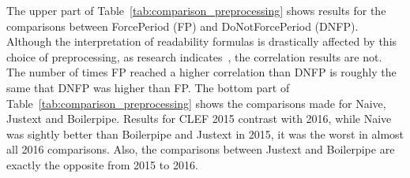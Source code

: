 The upper part of Table~\ref{tab:comparison_preprocessing} shows results for the comparisons between ForcePeriod (FP) and DoNotForcePeriod (DNFP). Although the interpretation of readability formulas is drastically affected by this choice of preprocessing, as research indicates~\cite{palotti15}, the correlation results are not.
The number of times FP reached a higher correlation than DNFP is roughly the same that DNFP was higher than FP.
The bottom part of Table~\ref{tab:comparison_preprocessing} shows the comparisons made for Naive, Justext and Boilerpipe. Results for CLEF 2015 contrast with 2016, while Naive was sightly better than Boilerpipe and Justext in 2015, it was the worst in almost all 2016 comparisons. Also, the comparisons between Justext and Boilerpipe are exactly the opposite from 2015 to 2016.

%

%


